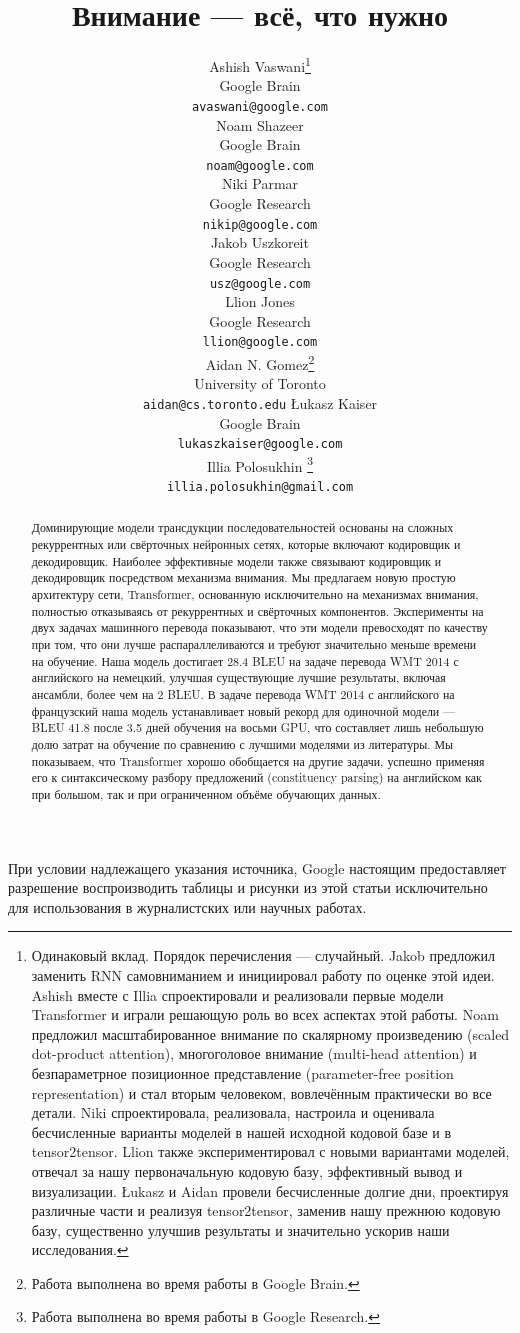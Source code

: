 \documentclass{article}
\title{Внимание — всё, что нужно}
\author{
  \AND
  Ashish Vaswani\thanks{Одинаковый вклад. Порядок перечисления — случайный. Jakob предложил заменить RNN самовниманием и инициировал работу по оценке этой идеи.
Ashish вместе с Illia спроектировали и реализовали первые модели Transformer и играли решающую роль во всех аспектах этой работы. Noam предложил масштабированное внимание по скалярному произведению (scaled dot-product attention), многоголовое внимание (multi-head attention) и безпараметрное позиционное представление (parameter-free position representation) и стал вторым человеком, вовлечённым практически во все детали. Niki спроектировала, реализовала, настроила и оценивала бесчисленные варианты моделей в нашей исходной кодовой базе и в tensor2tensor. Llion также экспериментировал с новыми вариантами моделей, отвечал за нашу первоначальную кодовую базу, эффективный вывод и визуализации. Łukasz и Aidan провели бесчисленные долгие дни, проектируя различные части и реализуя tensor2tensor, заменив нашу прежнюю кодовую базу, существенно улучшив результаты и значительно ускорив наши исследования.}\\
  Google Brain\\
  \texttt{avaswani@google.com}\\
  \And
  Noam Shazeer\footnotemark[1]\\
  Google Brain\\
  \texttt{noam@google.com}\\
  \And
  Niki Parmar\footnotemark[1]\\
  Google Research\\
  \texttt{nikip@google.com}\\  
  \And
  Jakob Uszkoreit\footnotemark[1]\\
  Google Research\\
  \texttt{usz@google.com}\\
  \And  
  Llion Jones\footnotemark[1]\\
  Google Research\\
  \texttt{llion@google.com}\\   
  \And
  Aidan N. Gomez\footnotemark[1] \hspace{1.7mm}\thanks{Работа выполнена во время работы в Google Brain.}\\
  University of Toronto\\
  \texttt{aidan@cs.toronto.edu}
  \And
  {\L}ukasz Kaiser\footnotemark[1]\\
  Google Brain\\
  \texttt{lukaszkaiser@google.com}\\
  \And
  Illia Polosukhin\footnotemark[1]\hspace{1.7mm} \thanks{Работа выполнена во время работы в Google Research.}\\
  \texttt{illia.polosukhin@gmail.com}\\  
}
\begin{document}
\begin{center}
    \color{red}
    \large При условии надлежащего указания источника, Google настоящим предоставляет разрешение воспроизводить таблицы и рисунки из этой статьи исключительно для использования в журналистских или научных работах.
\end{center}

\maketitle

\begin{abstract}
Доминирующие модели трансдукции последовательностей основаны на сложных рекуррентных или свёрточных нейронных сетях, которые включают кодировщик и декодировщик. Наиболее эффективные модели также связывают кодировщик и декодировщик посредством механизма внимания. Мы предлагаем новую простую архитектуру сети, Transformer, основанную исключительно на механизмах внимания, полностью отказываясь от рекуррентных и свёрточных компонентов. Эксперименты на двух задачах машинного перевода показывают, что эти модели превосходят по качеству при том, что они лучше распараллеливаются и требуют значительно меньше времени на обучение. Наша модель достигает 28.4 BLEU на задаче перевода WMT 2014 с английского на немецкий, улучшая существующие лучшие результаты, включая ансамбли, более чем на 2 BLEU. В задаче перевода WMT 2014 с английского на французский наша модель устанавливает новый рекорд для одиночной модели — BLEU 41.8 после 3.5 дней обучения на восьми GPU, что составляет лишь небольшую долю затрат на обучение по сравнению с лучшими моделями из литературы. Мы показываем, что Transformer хорошо обобщается на другие задачи, успешно применяя его к синтаксическому разбору предложений (constituency parsing) на английском как при большом, так и при ограниченном объёме обучающих данных.



\end{abstract}
\end{document}
